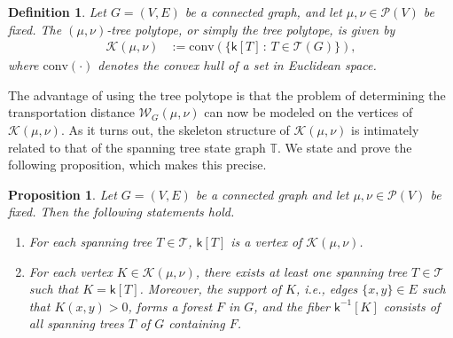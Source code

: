 \documentclass[10pt,a4paper]{amsart}
\newcommand{\prob}{{\mathscr{P}}}
\newcommand{\wass}{{\mathcal{W}}}
\newcommand{\setoftrees}{{\mathcal{T}}}
\newcommand{\stategraph}{{\mathbb{T}}}
\newcommand{\embedding}{{\mathsf{k}}}
\newcommand{\flowpoly}{{\mathcal{K}}}
\newtheorem{definition}[theorem]{Definition}
\newtheorem{proposition}[theorem]{Proposition}
\begin{document}
    \begin{definition}\label{def:flow-polytope}
        Let $G=(V,E)$ be a connected graph, and let $\mu,\nu\in\prob(V)$ be fixed. The \emph{$(\mu,\nu)$-tree polytope,} or simply the tree polytope, is given by
            \begin{align*}
                \flowpoly(\mu,\nu) &:= \mathrm{conv}\left(\{\embedding[T] \,:\, T\in\mathcal{T}(G)\} \right),
            \end{align*}
        where $\mathrm{conv}(\cdot)$ denotes the convex hull of a set in Euclidean space.
    \end{definition}    

    The advantage of using the tree polytope is that the problem of determining the transportation distance $\wass_G(\mu,\nu)$ can now be modeled on the vertices of $\flowpoly(\mu,\nu)$. As it turns out, the skeleton structure of $\flowpoly(\mu,\nu)$ is intimately related to that of the spanning tree state graph $\stategraph$. We state and prove the following proposition, which makes this precise.

    \begin{proposition}\label{prop:vertices-of-polytope}
        Let $G=(V,E)$ be a connected graph and let $\mu,\nu\in\prob(V)$ be fixed. Then the following statements hold.
            \begin{enumerate}[label=(\roman*)]
                \item For each spanning tree $T\in\setoftrees$, $\embedding[T]$ is a vertex of $\flowpoly(\mu,\nu)$.
                \item For each vertex $K\in\flowpoly(\mu,\nu)$, there exists at least one spanning tree $T\in\setoftrees$ such that $K = \embedding[T]$. Moreover, the support of $K$, i.e., edges $\{x,y\}\in E$ such that $K(x,y)>0$, forms a forest $F$ in $G$, and the fiber $\embedding^{-1}[K]$ consists of all spanning trees $T$ of $G$ containing $F$.
            \end{enumerate}
    \end{proposition}
\end{document}
